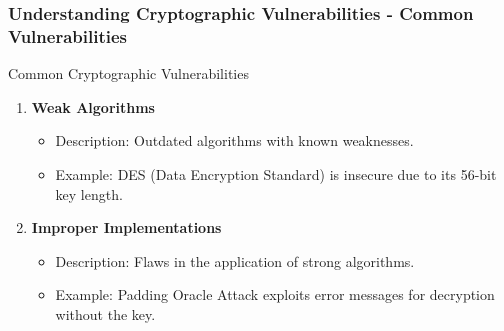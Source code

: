 \documentclass{beamer}
\begin{document}
\begin{frame}[fragile]
    \frametitle{Understanding Cryptographic Vulnerabilities - Common Vulnerabilities}
    \begin{block}{Common Cryptographic Vulnerabilities}
        \begin{enumerate}
            \item \textbf{Weak Algorithms}
                \begin{itemize}
                    \item Description: Outdated algorithms with known weaknesses.
                    \item Example: DES (Data Encryption Standard) is insecure due to its 56-bit key length.
                \end{itemize}
                
            \item \textbf{Improper Implementations}
                \begin{itemize}
                    \item Description: Flaws in the application of strong algorithms.
                    \item Example: Padding Oracle Attack exploits error messages for decryption without the key.
                \end{itemize}
        \end{enumerate}
    \end{block}
\end{frame}
\end{document}
